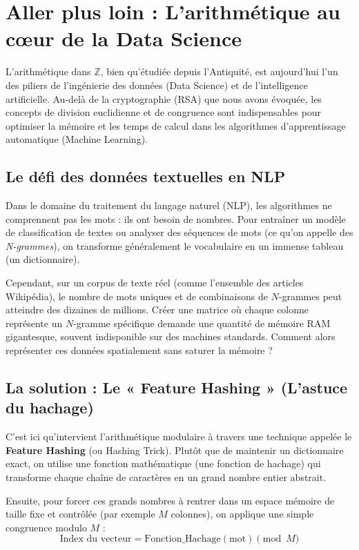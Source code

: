 \section*{Aller plus loin : L'arithmétique au cœur de la Data Science}

L'arithmétique dans $\mathbb{Z}$, bien qu'étudiée depuis l'Antiquité, est aujourd'hui l'un des piliers de l'ingénierie des données (Data Science) et de l'intelligence artificielle. Au-delà de la cryptographie (RSA) que nous avons évoquée, les concepts de division euclidienne et de congruence sont indispensables pour optimiser la mémoire et les temps de calcul dans les algorithmes d'apprentissage automatique (Machine Learning).

\subsection*{Le défi des données textuelles en NLP}

Dans le domaine du traitement du langage naturel (NLP), les algorithmes ne comprennent pas les mots : ils ont besoin de nombres. Pour entraîner un modèle de classification de textes ou analyser des séquences de mots (ce qu'on appelle des \textit{N-grammes}), on transforme généralement le vocabulaire en un immense tableau (un dictionnaire). 

Cependant, sur un corpus de texte réel (comme l'ensemble des articles Wikipédia), le nombre de mots uniques et de combinaisons de $N$-grammes peut atteindre des dizaines de millions. Créer une matrice où chaque colonne représente un $N$-gramme spécifique demande une quantité de mémoire RAM gigantesque, souvent indisponible sur des machines standards. Comment alors représenter ces données spatialement sans saturer la mémoire ?

\subsection*{La solution : Le « Feature Hashing » (L'astuce du hachage)}

C'est ici qu'intervient l'arithmétique modulaire à travers une technique appelée le \textbf{Feature Hashing} (ou Hashing Trick). Plutôt que de maintenir un dictionnaire exact, on utilise une fonction mathématique (une fonction de hachage) qui transforme chaque chaîne de caractères en un grand nombre entier abstrait.

Ensuite, pour forcer ces grands nombres à rentrer dans un espace mémoire de taille fixe et contrôlée (par exemple $M$ colonnes), on applique une simple congruence modulo $M$ :
$$ \text{Index du vecteur} = \text{Fonction\_Hachage}(\text{mot}) \pmod M $$



